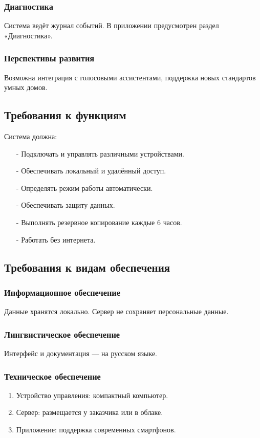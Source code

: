 \documentclass[oneside,a4paper,14pt]{extarticle}
\begin{document}
\subsubsection{Диагностика}
Система ведёт журнал событий. В приложении предусмотрен раздел «Диагностика».

\subsubsection{Перспективы развития}
Возможна интеграция с голосовыми ассистентами, поддержка новых стандартов умных домов.

\subsection{Требования к функциям}
Система должна:
\begin{itemize}
    \item[-] Подключать и управлять различными устройствами.
    \item[-] Обеспечивать локальный и удалённый доступ.
    \item[-] Определять режим работы автоматически.
    \item[-] Обеспечивать защиту данных.
    \item[-] Выполнять резервное копирование каждые 6 часов.
    \item[-] Работать без интернета.
\end{itemize}

\subsection{Требования к видам обеспечения}

\subsubsection{Информационное обеспечение}
Данные хранятся локально. Сервер не сохраняет персональные данные.

\subsubsection{Лингвистическое обеспечение}
Интерфейс и документация — на русском языке.

\subsubsection{Техническое обеспечение}
\begin{enumerate}
    \item Устройство управления: компактный компьютер.
    \item Сервер: размещается у заказчика или в облаке.
    \item Приложение: поддержка современных смартфонов.
\end{enumerate}
\end{document}
